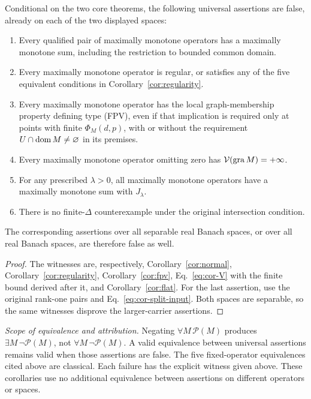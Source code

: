 \begin{corollary}\label{cor:universal}
Conditional on the two core theorems, the following universal assertions
are false, already on each of the two displayed spaces:
\begin{enumerate}
\item Every qualified pair of maximally monotone operators has a maximally
monotone sum, including the restriction to bounded common domain.
\item Every maximally monotone operator is regular, or satisfies any of
the five equivalent conditions in Corollary~\ref{cor:regularity}.
\item Every maximally monotone operator has the local graph-membership
property defining type (FPV), even if that implication is required only
at points with finite $\Phi_M(d,p)$, with or without the requirement
$U\cap\operatorname{dom} M\ne\varnothing$ in its premises.
\item Every maximally monotone operator omitting zero has
$\mathcal V(\operatorname{gra} M)=+\infty$.
\item For any prescribed $\lambda>0$, all maximally monotone operators
have a maximally monotone sum with $J_\lambda$.
\item There is no finite-$\Delta$ counterexample under the original
intersection condition.
\end{enumerate}
The corresponding assertions over all separable real Banach spaces,
or over all real Banach spaces, are therefore false as well.
\end{corollary}
\begin{proof}
The witnesses are, respectively, Corollary~\ref{cor:normal},
Corollary~\ref{cor:regularity}, Corollary~\ref{cor:fpv},
Eq.~\eqref{eq:cor-V} with the finite bound derived after it, and
Corollary~\ref{cor:flat}. For the last assertion, use the original
rank-one pairs and Eq.~\eqref{eq:cor-split-input}. Both spaces are
separable, so the same witnesses disprove the larger-carrier assertions.
\end{proof}

\noindent\textit{Scope of equivalence and attribution.}
Negating $\forall M\,\mathcal P(M)$ produces $\exists M\,\neg\mathcal P(M)$,
not $\forall M\,\neg\mathcal P(M)$. A valid equivalence between universal
assertions remains valid when those assertions are false. The five
fixed-operator equivalences cited above are classical. Each failure has
the explicit witness given above. These corollaries use no additional
equivalence between assertions on different operators or spaces.

